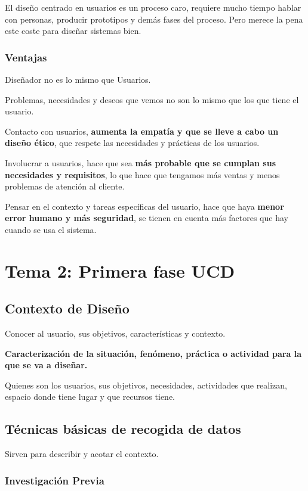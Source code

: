 \documentclass[12pt, twoside, openright]{report} %
\begin{document}
El diseño centrado en usuarios es un proceso caro, requiere mucho tiempo
hablar con personas, producir prototipos y demás fases del proceso. Pero
merece la pena este coste para diseñar sistemas bien.

\subsection{Ventajas}

Diseñador no es lo mismo que Usuarios.

Problemas, necesidades y deseos que vemos no son lo mismo que los que
tiene el usuario.

Contacto con usuarios, \textbf{aumenta la empatía y que se lleve a cabo
	un diseño ético}, que respete las necesidades y prácticas de los
usuarios.

Involucrar a usuarios, hace que sea \textbf{más probable que se cumplan
	sus necesidades y requisitos}, lo que hace que tengamos más ventas y
menos problemas de atención al cliente.

Pensar en el contexto y tareas específicas del usuario, hace que haya
\textbf{menor error humano y más seguridad}, se tienen en cuenta más
factores que hay cuando se usa el sistema.

\chapter{Tema 2: Primera fase UCD}

\section{Contexto de Diseño}

Conocer al usuario, sus objetivos, características y contexto.

\textbf{Caracterización de la situación, fenómeno, práctica o actividad
	para la que se va a diseñar.}

Quienes son los usuarios, sus objetivos, necesidades, actividades que
realizan, espacio donde tiene lugar y que recursos tiene.

\section{Técnicas básicas de recogida de
  datos}

Sirven para describir y acotar el contexto.

\subsection{Investigación Previa}
\end{document}
